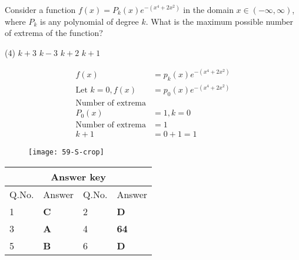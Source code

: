 \begin{questions}
\begin{minipage}{\textwidth}
	\question Consider a function $f(x)=P_{k}(x) e^{-\left(x^{4}+2 x^{2}\right)}$ in the domain $x \in(-\infty, \infty)$, where $P_{k}$ is any polynomial of degree $k$. What is the maximum possible number of extrema of the function?
\end{minipage}
\begin{tasks}(4)
	\task[\textbf{A.}] $k+3$
	\task[\textbf{B.}] $k-3$
	\task[\textbf{C.}]$k+2$
	\task[\textbf{D.}]$k+1$
\end{tasks}
\begin{answer}
	\begin{align*}
	f(x)&=p_{k}(x) e^{-\left(x^{4}+2 x^{2}\right)}\\
	\text{Let } k=0, f(x)&=p_{0}(x) e^{-\left(x^{4}+2 x^{2}\right)}\\
	\text{Number of extrema}\\
	P_{0}(x)&=1, k=0\\
	\text{Number of extrema} &=1\\
	k+1&=0+1=1
	\end{align*}
	\begin{figure}[H]
		\begin{center}
			\texttt{[image: 59-S-crop]}
		\end{center}
	\end{figure}
\end{answer}
\end{questions}
\setlength\arrayrulewidth{1pt}
\begin{table}[H]
	\centering
	\begin{tabular}{|p{1.5cm}|p{1.5cm}||p{1.5cm}|p{1.5cm}|}
		\hline
		\multicolumn{4}{|c|}{\textbf{Answer key}}\\\hline\hline
		\rowcolor{ocrel}Q.No.&Answer&Q.No.&Answer\\\hline
		1&\textbf{C} &2&\textbf{D}\\\hline 
		3&\textbf{A} &4&\textbf{64} \\\hline
		5&\textbf{B} &6&\textbf{D} \\\hline
		
		
	\end{tabular}
\end{table}